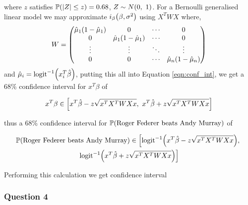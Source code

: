 \documentclass[11pt]{article} %
\let\originalleft\left
\let\originalright\right
\renewcommand{\left}{\mathopen{}\mathclose\bgroup\originalleft}
\renewcommand{\right}{\aftergroup\egroup\originalright}
\newcommand{\logit}{\text{logit}}
\begin{document}
where $z$ satisfies $\mathbb{P}\left(\left|Z\right| \leq z\right) = 0.68$, $Z \sim N\left(0,\ 1\right)$. For a Bernoulli generalised linear model we may approximate $i_\beta\left(\beta,\sigma^2\right)$ using $X^TWX$ where,
\begin{equation*}
	W = 
	\begin{pmatrix}
		\hat{\mu}_1\left(1-\hat{\mu}_1\right) & 0 & \cdots & 0\\
		0& \hat{\mu}_1\left(1-\hat{\mu}_1\right) & \cdots & 0\\
		\vdots & \vdots & \ddots & \vdots \\
		0 & 0 & \cdots &\hat{\mu}_n\left(1-\hat{\mu}_n\right) \\
	\end{pmatrix}
\end{equation*}
and $\hat{\mu}_i = \logit^{-1}\left(x_i^T\hat{\beta}\right)$, putting this all into Equation \ref{eqn:conf_int}, we get a 68\% confidence interval for $x^T\beta$ of

\begin{equation*}
	x^T\beta \in \left[x^T\hat{\beta} - z\sqrt{x^T  X^T W X  x},\ x^T\hat{\beta} + z\sqrt{x^T  X^T W X  x}  \right]
\end{equation*}

thus a 68\% confidence interval for $\mathbb{P}\left(\text{Roger Federer beats Andy Murray}\right)$ of

\begin{multline*}
	\mathbb{P}\left(\text{Roger Federer beats Andy Murray}\right) \in \left[\logit^{-1}\left(x^T\hat{\beta} - z\sqrt{x^T  X^T W X  x}\right),\right.\\
	\left.\logit^{-1}\left(x^T\hat{\beta} + z\sqrt{x^T  X^T W X  x}\right)\right]
\end{multline*}

Performing this calculation we get confidence interval


\subsubsection*{Question 4}
\end{document}
